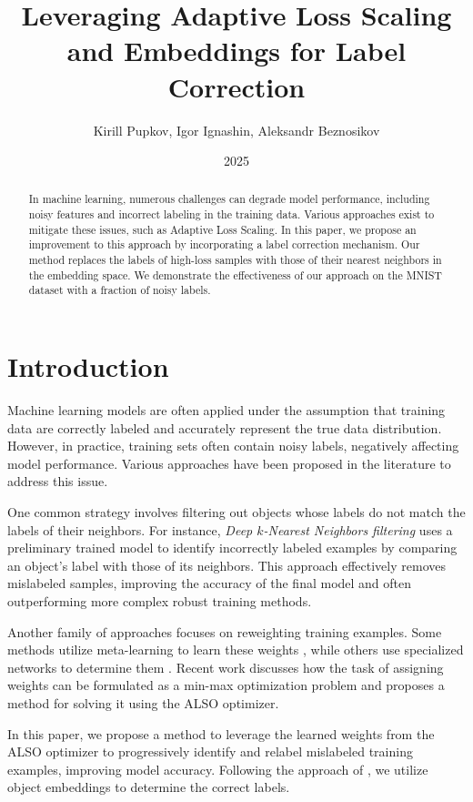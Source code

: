 \documentclass[12pt]{article}
\title{Leveraging Adaptive Loss Scaling and Embeddings for Label Correction}
\author{Kirill Pupkov, Igor Ignashin, Aleksandr Beznosikov}
\date{2025}
\begin{document}
\maketitle

\begin{abstract}

    In machine learning, numerous challenges can degrade model performance, including noisy features and incorrect labeling in the training data. Various approaches exist to mitigate these issues, such as Adaptive Loss Scaling. In this paper, we propose an improvement to this approach by incorporating a label correction mechanism. Our method replaces the labels of high-loss samples with those of their nearest neighbors in the embedding space. We demonstrate the effectiveness of our approach on the MNIST dataset with a fraction of noisy labels.

\end{abstract}

\section{Introduction}

Machine learning models are often applied under the assumption that training data are correctly labeled and accurately represent the true data distribution. However, in practice, training sets often contain noisy labels, negatively affecting model performance. Various approaches have been proposed in the literature to address this issue.

One common strategy involves filtering out objects whose labels do not match the labels of their neighbors. For instance, \textit{Deep $k$-Nearest Neighbors filtering} \citep{bahri2020deepknn} uses a preliminary trained model to identify incorrectly labeled examples by comparing an object's label with those of its neighbors. This approach effectively removes mislabeled samples, improving the accuracy of the final model and often outperforming more complex robust training methods.

Another family of approaches focuses on reweighting training examples. Some methods utilize meta-learning to learn these weights \citep{ren2018learning}, while others use specialized networks to determine them \citep{jiang2018mentornet}. Recent work \citep{also} discusses how the task of assigning weights can be formulated as a min-max optimization problem and proposes a method for solving it using the ALSO optimizer.

In this paper, we propose a method to leverage the learned weights from the ALSO optimizer to progressively identify and relabel mislabeled training examples, improving model accuracy. Following the approach of \citet{bahri2020deepknn}, we utilize object embeddings to determine the correct labels.
\end{document}
